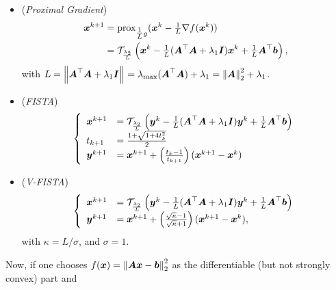 \begin{itemize}
    \item (\emph{Proximal Gradient})
    \begin{align*}
    \begin{split}
        \boldsymbol x^{k+1} &= \operatorname{prox}_{{\textstyle\frac{1}{L}} g}(\boldsymbol x^k - {\textstyle\frac{1}{L}} 
        \nabla f(\boldsymbol x^k)) \\
        &= \mathcal T_{\frac{\lambda_2}{L}} \left( \boldsymbol x^k 
        - {\textstyle\frac{1}{L}} (\boldsymbol A^\top \boldsymbol A + \lambda_1 \boldsymbol I) 
        \boldsymbol x^k + {\textstyle\frac{1}{L}} \boldsymbol A^\top\boldsymbol b
        \right),
    \end{split}
    \end{align*}
    with $L = \left\lVert\boldsymbol A^\top \boldsymbol A + \lambda_1 \boldsymbol I\right\rVert_{}
    = \lambda_{\max} (\boldsymbol A^\top \boldsymbol A) + \lambda_1 = \left\lVert\boldsymbol A\right\rVert_{2}^2
    + \lambda_1$.
    \item (\emph{FISTA})
    \begin{align*}
    \begin{split}
    \left\{
    \begin{array}{lll}
        \boldsymbol x^{k+1} &= \mathcal T_{\frac{\lambda_2}{L}} 
        \left( \boldsymbol y^k - {\textstyle\frac{1}{L}} (\boldsymbol A^\top \boldsymbol A + \lambda_1 \boldsymbol I) 
        \boldsymbol y^k + {\textstyle\frac{1}{L}} \boldsymbol A^\top\boldsymbol b \right) \\
        t_{k+1} &= \frac{1+\sqrt{1+4t_k^2}}{2} \\
        \boldsymbol y^{k+1} &= \boldsymbol x^{k+1} + \left( 
        \frac{t_k-1}{t_{k+1}} \right) (\boldsymbol x^{k+1}- \boldsymbol x^k)
    \end{array}
    \right.
    \end{split}
    \end{align*}
    \item (\emph{V-FISTA})
    \begin{align*}
    \begin{split}
    \left\{
    \begin{array}{ll}
        \boldsymbol x^{k+1} &= \mathcal T_{\frac{\lambda_2}{L}} 
        \left( \boldsymbol y^k - {\textstyle\frac{1}{L}} (\boldsymbol A^\top \boldsymbol A + \lambda_1 \boldsymbol I) 
        \boldsymbol y^k + {\textstyle\frac{1}{L}} \boldsymbol A^\top\boldsymbol b \right) \\
        \boldsymbol y^{k+1} &= \boldsymbol x^{k+1} + \left( 
        \frac{\sqrt\kappa-1}{\sqrt\kappa+1} \right) 
        (\boldsymbol x^{k+1}- \boldsymbol x^k),
    \end{array}
    \right.
    \end{split}
    \end{align*}
    with $\kappa=L/\sigma$, and $\sigma=1$.
\end{itemize}
%
Now, if one chooses $f(\boldsymbol x) = \left\lVert\boldsymbol{Ax}-\boldsymbol b\right\rVert_{2}^2$ 
as the differentiable (but not strongly convex) part and 
